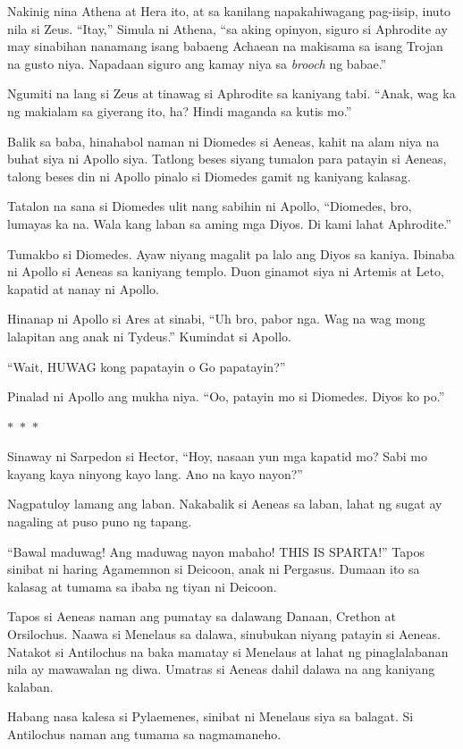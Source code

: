 \documentclass[12pt,letterpaper]{report}
\newcommand{\seperate}{\begin{center}$\ast$~$\ast$~$\ast$\end{center}}
\begin{document}
Nakinig nina Athena at Hera ito, at sa kanilang napakahiwagang pag-iisip, inuto nila si Zeus. ``Itay,'' Simula ni Athena, ``sa aking opinyon, siguro si Aphrodite ay may sinabihan nanamang isang babaeng Achaean na makisama sa isang Trojan na gusto niya. Napadaan siguro ang kamay niya sa \textit{brooch} ng babae.''

Ngumiti na lang si Zeus at tinawag si Aphrodite sa kaniyang tabi. ``Anak, wag ka ng makialam sa giyerang ito, ha? Hindi maganda sa kutis mo.''

Balik sa baba, hinahabol naman ni Diomedes si Aeneas, kahit na alam niya na buhat siya ni Apollo siya. Tatlong beses siyang tumalon para patayin si Aeneas, talong beses din ni Apollo pinalo si Diomedes gamit ng kaniyang kalasag.

Tatalon na sana si Diomedes ulit nang sabihin ni Apollo, ``Diomedes, bro, lumayas ka na. Wala kang laban sa aming mga Diyos. Di kami lahat Aphrodite.''

Tumakbo si Diomedes. Ayaw niyang magalit pa lalo ang Diyos sa kaniya. Ibinaba ni Apollo si Aeneas sa kaniyang templo. Duon ginamot siya ni Artemis at Leto, kapatid at nanay ni Apollo.

Hinanap ni Apollo si Ares at sinabi, ``Uh bro, pabor nga. Wag na wag mong lalapitan ang anak ni Tydeus.'' Kumindat si Apollo.

``Wait, HUWAG kong papatayin o Go papatayin?''

Pinalad ni Apollo ang mukha niya. ``Oo, patayin mo si Diomedes. Diyos ko po.''

\seperate

Sinaway ni Sarpedon si Hector, ``Hoy, nasaan yun mga kapatid mo? Sabi mo kayang kaya ninyong kayo lang. Ano na kayo nayon?''

Nagpatuloy lamang ang laban. Nakabalik si Aeneas sa laban, lahat ng sugat ay nagaling at puso puno ng tapang.

``Bawal maduwag! Ang maduwag nayon mabaho! THIS IS SPARTA!'' Tapos sinibat ni haring Agamemnon si Deicoon, anak ni Pergasus. Dumaan ito sa kalasag at tumama sa ibaba ng tiyan ni Deicoon.

Tapos si Aeneas naman ang pumatay sa dalawang Danaan, Crethon at Orsilochus. Naawa si Menelaus sa dalawa, sinubukan niyang patayin si Aeneas. Natakot si Antilochus na baka mamatay si Menelaus at lahat ng pinaglalabanan nila ay mawawalan ng diwa. Umatras si Aeneas dahil dalawa na ang kaniyang kalaban.

Habang nasa kalesa si Pylaemenes, sinibat ni Menelaus siya sa balagat. Si Antilochus naman ang tumama sa nagmamaneho.
\end{document}
